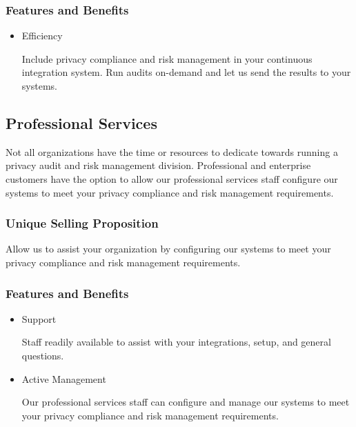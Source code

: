 \subsubsection*{Features and Benefits}

\begin{itemize}

\item Efficiency

Include privacy compliance and risk management in your continuous integration system. Run audits on-demand and let us send the results to your systems.

\end{itemize}


\subsection{Professional Services}

Not all organizations have the time or resources to dedicate towards running a privacy audit and risk management division. Professional and enterprise customers have the option to allow our professional services staff configure our systems to meet your privacy compliance and risk management requirements.

\subsubsection*{Unique Selling Proposition}

Allow us to assist your organization by configuring our systems to meet your privacy compliance and risk management requirements.

\subsubsection*{Features and Benefits}

\begin{itemize}

\item Support

Staff readily available to assist with your integrations, setup, and general questions.

\item Active Management

Our professional services staff can configure and manage our systems to meet your privacy compliance and risk management requirements.

\end{itemize}


